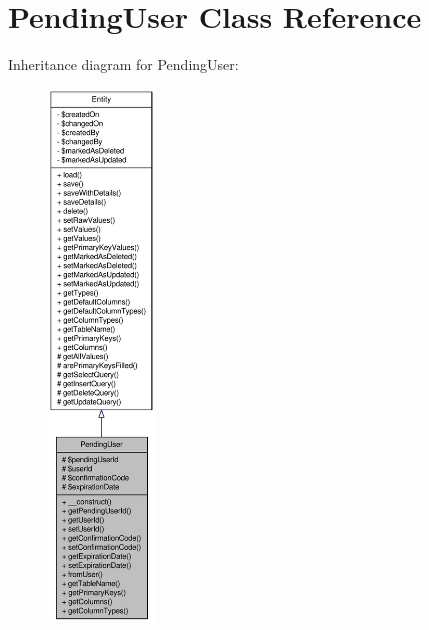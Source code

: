 \hypertarget{classPendingUser}{
\section{PendingUser Class Reference}
\label{classPendingUser}
}


Inheritance diagram for PendingUser:\nopagebreak
\begin{figure}[H]
\begin{center}
\leavevmode
\includegraphics[height=400pt]{classPendingUser__inherit__graph}
\end{center}
\end{figure}


